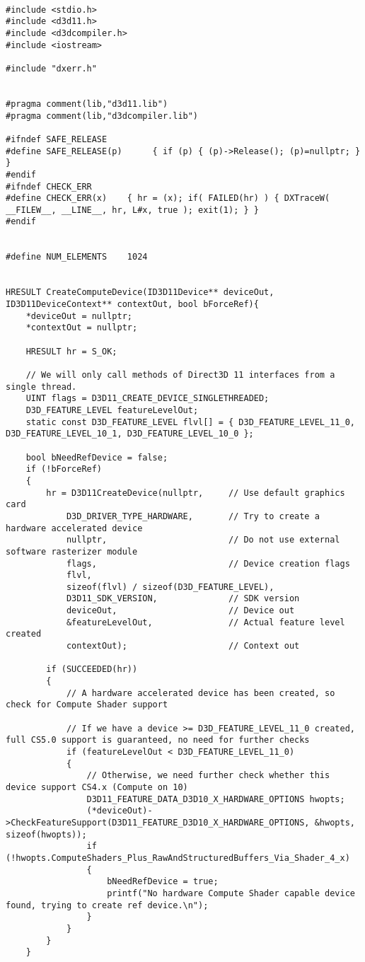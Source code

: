 \begin{lstlisting}

#include <stdio.h>
#include <d3d11.h>
#include <d3dcompiler.h>
#include <iostream>

#include "dxerr.h"


#pragma comment(lib,"d3d11.lib")
#pragma comment(lib,"d3dcompiler.lib")

#ifndef SAFE_RELEASE
#define SAFE_RELEASE(p)      { if (p) { (p)->Release(); (p)=nullptr; } }
#endif
#ifndef CHECK_ERR
#define CHECK_ERR(x)    { hr = (x); if( FAILED(hr) ) { DXTraceW( __FILEW__, __LINE__, hr, L#x, true ); exit(1); } }
#endif


#define NUM_ELEMENTS	1024


HRESULT CreateComputeDevice(ID3D11Device** deviceOut, ID3D11DeviceContext** contextOut, bool bForceRef){
	*deviceOut = nullptr;
	*contextOut = nullptr;

	HRESULT hr = S_OK;

	// We will only call methods of Direct3D 11 interfaces from a single thread.
	UINT flags = D3D11_CREATE_DEVICE_SINGLETHREADED;
	D3D_FEATURE_LEVEL featureLevelOut;
	static const D3D_FEATURE_LEVEL flvl[] = { D3D_FEATURE_LEVEL_11_0, D3D_FEATURE_LEVEL_10_1, D3D_FEATURE_LEVEL_10_0 };

	bool bNeedRefDevice = false;
	if (!bForceRef)
	{
		hr = D3D11CreateDevice(nullptr,     // Use default graphics card
			D3D_DRIVER_TYPE_HARDWARE,		// Try to create a hardware accelerated device
			nullptr,                        // Do not use external software rasterizer module
			flags,							// Device creation flags
			flvl,
			sizeof(flvl) / sizeof(D3D_FEATURE_LEVEL),
			D3D11_SDK_VERSION,				// SDK version
			deviceOut,						// Device out
			&featureLevelOut,               // Actual feature level created
			contextOut);					// Context out

		if (SUCCEEDED(hr))
		{
			// A hardware accelerated device has been created, so check for Compute Shader support

			// If we have a device >= D3D_FEATURE_LEVEL_11_0 created, full CS5.0 support is guaranteed, no need for further checks
			if (featureLevelOut < D3D_FEATURE_LEVEL_11_0)
			{
				// Otherwise, we need further check whether this device support CS4.x (Compute on 10)
				D3D11_FEATURE_DATA_D3D10_X_HARDWARE_OPTIONS hwopts;
				(*deviceOut)->CheckFeatureSupport(D3D11_FEATURE_D3D10_X_HARDWARE_OPTIONS, &hwopts, sizeof(hwopts));
				if (!hwopts.ComputeShaders_Plus_RawAndStructuredBuffers_Via_Shader_4_x)
				{
					bNeedRefDevice = true;
					printf("No hardware Compute Shader capable device found, trying to create ref device.\n");
				}
			}
		}
	}


\end{lstlisting}
